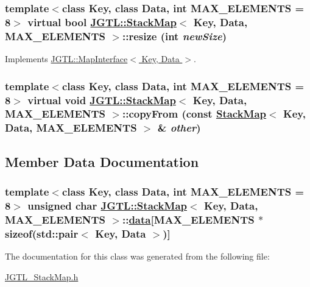 \hypertarget{class_j_g_t_l_1_1_stack_map_cd9363efffeb00f6b48b21ed2685ac7c}{
\subsubsection[resize]{\setlength{\rightskip}{0pt plus 5cm}template$<$class Key, class Data, int MAX\_\-ELEMENTS = 8$>$ virtual bool \hyperlink{class_j_g_t_l_1_1_stack_map}{JGTL::Stack\-Map}$<$ Key, Data, MAX\_\-ELEMENTS $>$::resize (int {\em new\-Size})}}
\label{class_j_g_t_l_1_1_stack_map_cd9363efffeb00f6b48b21ed2685ac7c}




Implements \hyperlink{class_j_g_t_l_1_1_map_interface_177b75de36104c54e53080db65b777a2}{JGTL::Map\-Interface$<$ Key, Data $>$}.\hypertarget{class_j_g_t_l_1_1_stack_map_3475bde07f081d0c7bbf821703c6f099}{
\subsubsection[copyFrom]{\setlength{\rightskip}{0pt plus 5cm}template$<$class Key, class Data, int MAX\_\-ELEMENTS = 8$>$ virtual void \hyperlink{class_j_g_t_l_1_1_stack_map}{JGTL::Stack\-Map}$<$ Key, Data, MAX\_\-ELEMENTS $>$::copy\-From (const \hyperlink{class_j_g_t_l_1_1_stack_map}{Stack\-Map}$<$ Key, Data, MAX\_\-ELEMENTS $>$ \& {\em other})}}
\label{class_j_g_t_l_1_1_stack_map_3475bde07f081d0c7bbf821703c6f099}




\subsection{Member Data Documentation}
\hypertarget{class_j_g_t_l_1_1_stack_map_9a3cc307f2892b669714253d75792e2e}{
\subsubsection[data]{\setlength{\rightskip}{0pt plus 5cm}template$<$class Key, class Data, int MAX\_\-ELEMENTS = 8$>$ unsigned char \hyperlink{class_j_g_t_l_1_1_stack_map}{JGTL::Stack\-Map}$<$ Key, Data, MAX\_\-ELEMENTS $>$::\hyperlink{class_j_g_t_l_1_1_stack_map_9a3cc307f2892b669714253d75792e2e}{data}\mbox{[}MAX\_\-ELEMENTS $\ast$sizeof(std::pair$<$ Key, Data $>$)\mbox{]}}}
\label{class_j_g_t_l_1_1_stack_map_9a3cc307f2892b669714253d75792e2e}




The documentation for this class was generated from the following file:\begin{CompactItemize}
\item 
\hyperlink{_j_g_t_l___stack_map_8h}{JGTL\_\-Stack\-Map.h}\end{CompactItemize}
